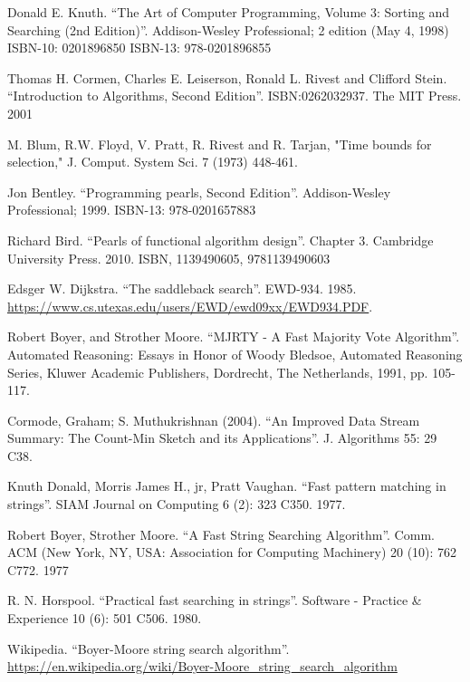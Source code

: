 \documentclass[b5paper]{article}
\begin{document}
\begin{thebibliography}{99}

Donald E. Knuth. ``The Art of Computer Programming, Volume 3: Sorting and Searching (2nd Edition)''. Addison-Wesley Professional; 2 edition (May 4, 1998) ISBN-10: 0201896850 ISBN-13: 978-0201896855

Thomas H. Cormen, Charles E. Leiserson, Ronald L. Rivest and Clifford Stein.
``Introduction to Algorithms, Second Edition''. ISBN:0262032937. The MIT Press. 2001

M. Blum, R.W. Floyd, V. Pratt, R. Rivest and R. Tarjan, "Time bounds for selection," J. Comput. System Sci. 7 (1973) 448-461.

Jon Bentley. ``Programming pearls, Second Edition''. Addison-Wesley Professional; 1999. ISBN-13: 978-0201657883

Richard Bird. ``Pearls of functional algorithm design''. Chapter 3. Cambridge University Press. 2010. ISBN, 1139490605, 9781139490603

Edsger W. Dijkstra. ``The saddleback search''. EWD-934. 1985. \url{https://www.cs.utexas.edu/users/EWD/ewd09xx/EWD934.PDF}.

Robert Boyer, and Strother Moore. ``MJRTY - A Fast Majority Vote Algorithm''. Automated Reasoning: Essays in Honor of Woody Bledsoe, Automated Reasoning Series, Kluwer Academic Publishers, Dordrecht, The Netherlands, 1991, pp. 105-117.

Cormode, Graham; S. Muthukrishnan (2004). ``An Improved Data Stream Summary: The Count-Min Sketch and its Applications''. J. Algorithms 55: 29 C38.

Knuth Donald, Morris James H., jr, Pratt Vaughan. ``Fast pattern matching in strings''. SIAM Journal on Computing 6 (2): 323 C350. 1977.

Robert Boyer, Strother Moore. ``A Fast String Searching Algorithm''. Comm. ACM (New York, NY, USA: Association for Computing Machinery) 20 (10): 762 C772. 1977

R. N. Horspool. ``Practical fast searching in strings''. Software - Practice \& Experience 10 (6): 501 C506. 1980.

Wikipedia. ``Boyer-Moore string search algorithm''. \url{https://en.wikipedia.org/wiki/Boyer-Moore_string_search_algorithm}


\end{thebibliography}
\end{document}
